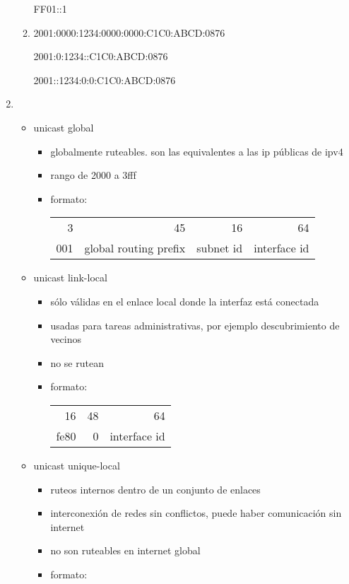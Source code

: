 \documentclass[11pt]{article}
\begin{document}
\begin{enumerate}
\begin{enumerate}
FF01::1
\item 2001:0000:1234:0000:0000:C1C0:ABCD:0876

2001:0:1234::C1C0:ABCD:0876

2001::1234:0:0:C1C0:ABCD:0876
\end{enumerate}
\item \begin{itemize}
\item unicast global
\begin{itemize}
\item globalmente ruteables. son las equivalentes a las ip públicas de ipv4
\item rango de 2000 a 3fff
\item formato:
\begin{center}
\begin{tabular}{rrrr}
3 & 45 & 16 & 64\\
001 & global routing prefix & subnet id & interface id\\
\end{tabular}
\end{center}
\end{itemize}
\item unicast link-local
\begin{itemize}
\item sólo válidas en el enlace local donde la interfaz está conectada
\item usadas para tareas administrativas, por ejemplo descubrimiento de vecinos
\item no se rutean
\item formato:
\begin{center}
\begin{tabular}{rrr}
16 & 48 & 64\\
fe80 & 0 & interface id\\
\end{tabular}
\end{center}
\end{itemize}
\item unicast unique-local
\begin{itemize}
\item ruteos internos dentro de un conjunto de enlaces
\item interconexión de redes sin conflictos, puede haber comunicación sin internet
\item no son ruteables en internet global
\item formato:
\begin{center}
\begin{tabular}{rrrrr}

\end{tabular}
\end{center}
\end{itemize}
\end{itemize}
\end{enumerate}
\end{document}
